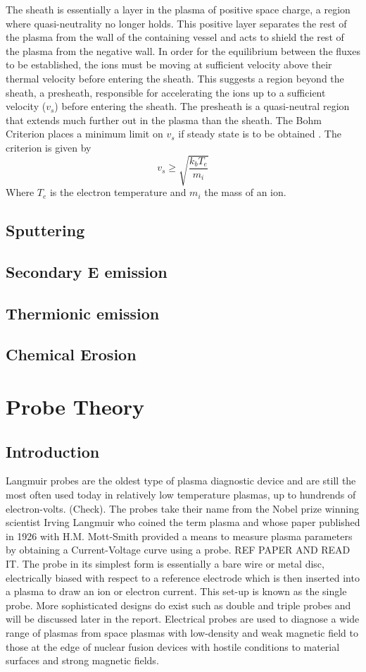 \documentclass[12pt]{article}
\def\be{\begin{equation}}
\def\ee{\end{equation}}
\begin{document}
The sheath is essentially a layer in the plasma of positive space charge, a region where quasi-neutrality no longer holds. This positive layer separates the rest of the plasma from the wall of the containing vessel and acts to shield the rest of the plasma from the negative wall. In order for the equilibrium between the fluxes to be established, the ions must be moving at sufficient velocity above their thermal velocity before entering the sheath. This suggests a region beyond the sheath, a presheath, responsible for accelerating the ions up to a sufficient velocity ($v_s$) before entering the sheath. The presheath is a quasi-neutral region that extends much further out in the plasma than the sheath. The Bohm Criterion places a minimum limit on $v_s$ if steady state is to be obtained \cite{Bohmcriterion}. The criterion is given by 
\be
v_s \geq \sqrt{\frac{k_b T_e}{m_i}}
\label{bohm}
\ee
Where $T_e$ is the electron temperature and $m_i$ the mass of an ion. 
\subsection{Sputtering}
\subsection{Secondary E emission}
\subsection{Thermionic emission}
\subsection{Chemical Erosion}
\section{Probe Theory}
\subsection{Introduction}
Langmuir probes are the oldest type of plasma diagnostic device and are still the most often used today in relatively low temperature plasmas, up to hundrends of electron-volts. (Check). The probes take their name from the Nobel prize winning scientist Irving Langmuir who coined the term plasma and whose paper published in 1926 with H.M. Mott-Smith provided a means to measure plasma parameters by obtaining a Current-Voltage curve using a probe. REF PAPER AND READ IT. The probe in its simplest form is essentially a bare wire or metal disc, electrically biased with respect to a reference electrode which is then inserted into a plasma to draw an ion or electron current. This set-up is known as the single probe. More sophisticated  designs do exist such as double and triple probes and will be discussed later in the report. Electrical probes are used to diagnose a wide range of plasmas from space plasmas with low-density and weak magnetic field to those at the edge of nuclear fusion devices with hostile conditions to material surfaces and strong magnetic fields.
\end{document}
